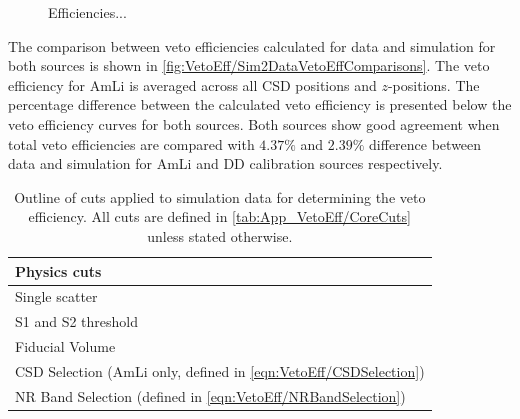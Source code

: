 \begin{figure}[!ht]
\begin{subfigure}[b]{0.49\textwidth}
        \caption{}
        \label{fig:VetoEff/DDSimEfficiencies}
    \end{subfigure}
    \caption{Efficiencies...}
    \label{fig:VetoEff/Sim2DataVetoEffComparisons}
\end{figure}

The comparison between veto efficiencies calculated for data and simulation for both sources is shown in \autoref{fig:VetoEff/Sim2DataVetoEffComparisons}. The veto efficiency for AmLi is averaged across all CSD positions and $z$-positions. The percentage difference between the calculated veto efficiency is presented below the veto efficiency curves for both sources. Both sources show good agreement when total veto efficiencies are compared with $4.37\%$ and $2.39\%$ difference between data and simulation for AmLi and DD calibration sources respectively.
\begin{table}[!ht]
	\centering
	\caption{Outline of cuts applied to simulation data for determining the veto efficiency. All cuts are defined in \autoref{tab:App_VetoEff/CoreCuts} unless stated otherwise.}
	\begin{tabular}{l}
        \hline\hline
        \textbf{Physics cuts}\\
        \hline
        Single scatter\\
        S1 and S2 threshold\\
        Fiducial Volume\\
        CSD Selection (AmLi only, defined in \autoref{eqn:VetoEff/CSDSelection})\\
        NR Band Selection (defined in \autoref{eqn:VetoEff/NRBandSelection})\\
        \hline\hline
	\end{tabular}
	\label{tab:VetoEff/calibration_simulation_efficiency_cuts}
\end{table}

